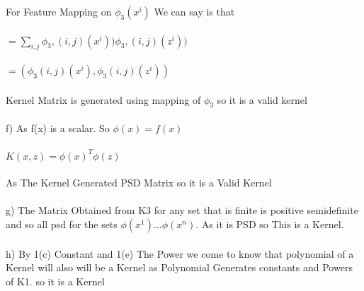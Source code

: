 \begin{answer}
For Feature Mapping on $\phi_3(x^i)$ We can say is that \\ \\
\tab[2cm] $ = \sum_{i,j}\phi_3,(i,j)(x^i))\phi_3,(i,j)(z^i))$ \\ \\
\tab[2cm] $ = (\phi_3(i,j)(x^i),\phi_3(i,j)(z^i))$ \\ \\
Kernel Matrix is generated using mapping of $\phi_3$ so it is a valid kernel \\ \\
f) As f(x) is a scalar. So $\phi(x)=f(x)$\\ \\
\tab $K(x,z)=\phi(x)^T\phi(z)$ \\ \\
As The Kernel Generated PSD Matrix so it is a Valid Kernel \\ \\
g) The Matrix Obtained from  K3 for any set that is finite is positive semidefinite and so all psd for the sets ${\phi(x^1) ... \phi(x^n)}$. As it is PSD so This is a Kernel. \\ \\
h) By 1(c) Constant and 1(e) The Power we come to know that polynomial of a Kernel will also will be a Kernel as Polynomial Generates constants and Powers of K1. so it is a Kernel
\end{answer}
